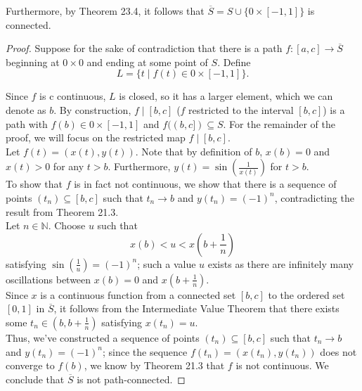 \documentclass[11pt]{article}
\begin{document}
Furthermore, by Theorem 23.4, it follows that $\overline{S} = S \cup \{ 0 \times [-1, 1] \}$ is connected.
\begin{proof}
Suppose for the sake of contradiction that there is a path $f \colon [a, c] \rightarrow \overline{S}$ beginning at $0 \times 0$ and ending at some point of $S$. Define
\[
    L = \{ t \mid f(t) \in 0 \times [-1, 1]\}.
\]

Since $f$ is c continuous, $L$ is closed, so it has a larger element, which we can denote as $b$. By construction, $f \mid [b, c]$ ($f$ restricted to the interval $[b, c]$) is a path with $f(b) \in 0 \times [-1, 1]$ and $f((b ,c]) \subseteq S$. For the remainder of the proof, we will focus on the restricted map $f \mid [b, c]$.\\

Let $f(t) = (x(t), y(t))$. Note that by definition of $b$, $x(b) = 0$ and $x(t) > 0$ for any $t > b$. Furthermore, $y(t) = \sin\left( \frac{1}{x(t)}\right)$ for $t > b$. \\

To show that $f$ is in fact not continuous, we show that there is a sequence of points $(t_n) \subseteq [b, c]$ such that $t_n \rightarrow b$ and $y(t_n) = (-1)^n$, contradicting the result from Theorem 21.3. \\

Let $n \in \mathbb{N}$. Choose $u$ such that 
\[ 
    x(b) < u < x\left( b + \frac{1}{n}\right)
\]
satisfying $\sin \left( \frac{1}{u} \right) = (-1)^n$; such a value $u$ exists as there are infinitely many oscillations between $x(b) = 0$ and $x\left( b + \frac{1}{n}\right)$. \\

Since $x$ is a continuous function from a connected set $[b, c]$ to the ordered set $[0, 1]$ in $\overline{S}$, it follows from the Intermediate Value Theorem that there exists some $t_n \in \left(b, b + \frac{1}{n}\right)$ satisfying $x(t_n) = u$. \\

Thus, we've constructed a sequence of points $(t_n) \subseteq [b, c]$ such that $t_n \rightarrow b$ and $y(t_n) = (-1)^n$; since the sequence $f(t_n) = (x(t_n), y(t_n))$ does not converge to $f(b)$, we know by Theorem 21.3 that $f$ is not continuous. We conclude that $\overline{S}$ is not path-connected.
\end{proof}
\end{document}
